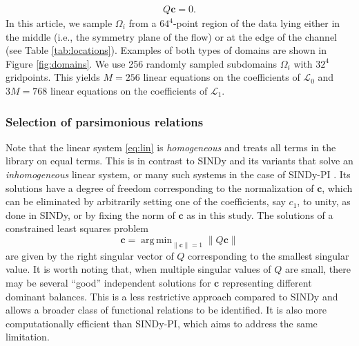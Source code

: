 \documentclass[preprint]{article}
\DeclareMathOperator*{\argmin}{arg\,min}
\def\bi#1{\textbf{#1}}
\def\mx#1{#1}
\begin{document}
\begin{align}
    \mx{Q}{\bi c} = 0.
    \label{eq:lin}
\end{align}
In this article, we sample $\Omega_i$ from a $64^4$-point region of the data lying either in the middle (i.e., the symmetry plane of the flow) or at the edge of the channel (see Table \ref{tab:locations}). Examples of both types of domains are shown in Figure \ref{fig:domains}.
We use 256 randomly sampled subdomains $\Omega_i$ with $32^4$ gridpoints. This yields $M=256$ linear equations on the coefficients of $\mathcal{L}_0$ and $3M=768$ linear equations on the coefficients of $\mathcal{L}_1$.



\subsubsection{Selection of parsimonious relations} 

Note that the linear system \eqref{eq:lin} is {\it homogeneous} and treats all terms in the library on equal terms. This is in contrast to SINDy \citep{brunton2016} and its variants \citep{messenger2021} that solve an {\it inhomogeneous} linear system, or many such systems in the case of SINDy-PI \citep{kaheman2020}.
Its solutions have a degree of freedom corresponding to the normalization of ${\bi c}$, which can be eliminated by arbitrarily setting one of the coefficients, say $c_1$, to unity, as done in SINDy, or by fixing the norm of ${\bi c}$ as in this study. The solutions of a constrained least squares problem
\begin{equation}
{\bi c}=\argmin_{\|{\bi c}\|=1}\|\mx{Q}{\bi c}\|
\label{eq:linn}
\end{equation}
are given by the right singular vector of $\mx{Q}$ corresponding to the smallest singular value.
It is worth noting that, when multiple singular values of $\mx{Q}$ are small, there may be several ``good'' independent solutions for ${\bi c}$ representing different dominant balances. This is a less restrictive approach compared to SINDy and allows a broader class of functional relations to be identified. It is also more computationally efficient than SINDy-PI, which aims to address the same limitation.
\end{document}

